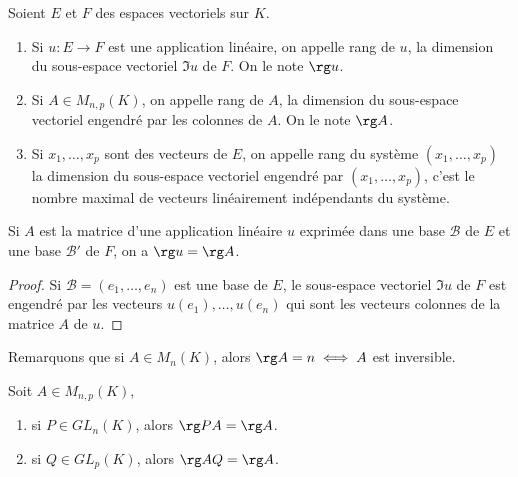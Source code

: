\documentclass[class=report,crop=false]{standalone}
\begin{document}
\begin{definition}
Soient $E$ et $F$ des espaces vectoriels sur $K$.
\begin{enumerate}
  \item Si $u : E\longrightarrow F$ est une application linéaire, 
  on appelle rang de $u$, la dimension du
sous-espace vectoriel $\Im u$ de $F$. On le note $\rg u$.
  \item Si $A\in M_{n,p}(K)$, on appelle rang de $A$, la dimension du 
  sous-espace vectoriel engendré par
les colonnes de $A$. On le note $\rg A$.
  \item Si $x_1,\dots,x_p$ sont des vecteurs de $E$, on appelle rang du 
  système $(x_1,\dots,x_p)$ la dimension du sous-espace vectoriel engendré 
  par $(x_1,\dots,x_p)$, c'est le nombre maximal de vecteurs linéairement 
  indépendants du système.
\end{enumerate} 
\end{definition}

\begin{proposition}
Si $A$ est la matrice d'une application linéaire $u$ exprimée 
dans une base $\mathcal{B}$ de $E$ et une base $\mathcal{B}'$ 
de $F$, on a $\rg u=\rg A$.
  
\end{proposition}

\begin{proof}
Si $\mathcal{B}=(e_1,\dots,e_n)$ est une base de $E$, 
le sous-espace vectoriel $\Im u$ de $F$ est engendré par 
les vecteurs $u(e_1),\dots,u(e_n)$ qui sont les vecteurs 
colonnes de la matrice $A$ de $u$.
\end{proof}

 

Remarquons que si $A\in M_n(K)$, alors $\rg A=n\iff A$ est inversible.

\begin{proposition}
Soit $A\in M_{n,p}(K)$,
\begin{enumerate}
  \item si $P\in GL_n(K)$, alors $\rg PA=\rg A$.
  \item si $Q\in GL_p(K)$, alors $\rg AQ=\rg A$.  
\end{enumerate}
\end{proposition}
\end{document}
